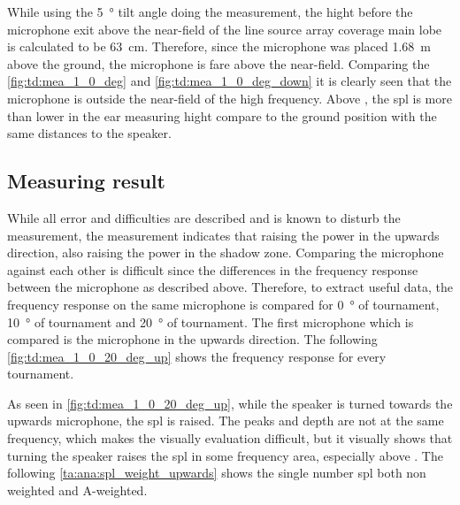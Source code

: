 

While using the \SI{5}{\degree} tilt angle doing the measurement, the hight before the microphone exit above the near-field of the line source array coverage main lobe is calculated to be \SI{63}{\centi\meter}. Therefore, since the microphone was placed \SI{1.68}{\meter} above the ground, the microphone is fare above the near-field. Comparing the \autoref{fig:td:mea_1_0_deg} and \autoref{fig:td:mea_1_0_deg_down} it is clearly seen that the microphone is outside the near-field of the high frequency. Above , the \gls{spl} is more than  lower in the ear measuring hight compare to the ground position with the same distances to the speaker. 

\subsection{Measuring result}\label{sec:des:measuring_result}
While all error and difficulties are described and is known to disturb the measurement, the measurement indicates that raising the power in the upwards direction, also raising the power in the shadow zone. Comparing the microphone against each other is difficult since the differences in the frequency response between the microphone as described above. Therefore, to extract useful data, the frequency response on the same microphone is compared for \SI{0}{\degree} of tournament, \SI{10}{\degree} of tournament and \SI{20}{\degree} of tournament.   
The first microphone which is compared is the microphone in the upwards direction. The following \autoref{fig:td:mea_1_0_20_deg_up} shows the frequency response for every tournament.


As seen in \autoref{fig:td:mea_1_0_20_deg_up}, while the speaker is turned towards the upwards microphone, the \gls{spl} is raised. The peaks and depth are not at the same frequency, which makes the visually evaluation difficult, but it visually shows that turning the speaker raises the \gls{spl} in some frequency area, especially above . The following \autoref{ta:ana:spl_weight_upwards} shows the single number \gls{spl} both non weighted and A-weighted.


